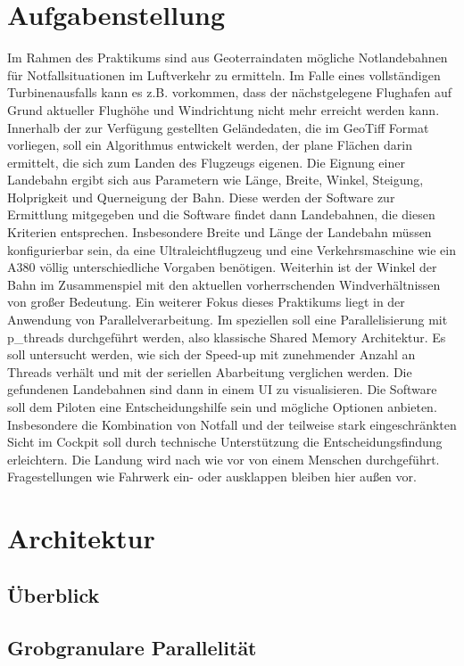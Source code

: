 \documentclass[10pt,a4paper]{report}
\begin{document}
\chapter{Aufgabenstellung}

Im Rahmen des Praktikums sind aus Geoterraindaten mögliche Notlandebahnen für Notfallsituationen im Luftverkehr zu ermitteln. Im Falle eines vollständigen Turbinenausfalls kann es z.B. vorkommen, dass der nächstgelegene Flughafen auf Grund aktueller Flughöhe und Windrichtung nicht mehr erreicht werden kann.
Innerhalb der zur Verfügung gestellten Geländedaten, die im GeoTiff Format vorliegen, soll ein Algorithmus entwickelt werden, der plane Flächen darin ermittelt, die sich zum Landen des Flugzeugs eigenen.
Die Eignung einer Landebahn ergibt sich aus Parametern wie Länge, Breite, Winkel, Steigung, Holprigkeit und Querneigung der Bahn.
Diese werden der Software zur Ermittlung mitgegeben und die Software findet dann Landebahnen, die diesen Kriterien entsprechen.
Insbesondere Breite und Länge der Landebahn müssen konfigurierbar sein, da eine Ultraleichtflugzeug und eine Verkehrsmaschine wie ein A380 völlig unterschiedliche Vorgaben benötigen.
Weiterhin ist der Winkel der Bahn im Zusammenspiel mit den aktuellen vorherrschenden Windverhältnissen von großer Bedeutung. 
Ein weiterer Fokus dieses Praktikums liegt in der Anwendung von Parallelverarbeitung.
Im speziellen soll eine Parallelisierung mit p\_threads durchgeführt werden, also klassische Shared Memory Architektur.
Es soll untersucht werden, wie sich der Speed-up mit zunehmender Anzahl an Threads verhält und mit der seriellen Abarbeitung verglichen werden.
Die gefundenen Landebahnen sind dann in einem UI zu visualisieren.
Die Software soll dem Piloten eine Entscheidungshilfe sein und mögliche Optionen anbieten. Insbesondere die Kombination von Notfall und der teilweise stark eingeschränkten Sicht im Cockpit soll durch technische Unterstützung die Entscheidungsfindung erleichtern.
Die Landung wird nach wie vor von einem Menschen durchgeführt. Fragestellungen wie Fahrwerk ein- oder ausklappen bleiben hier außen vor.     

\chapter{Architektur}

\section{Überblick}
\section{Grobgranulare Parallelität}
\end{document}
